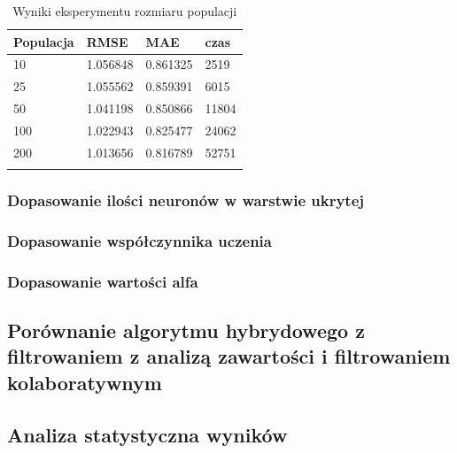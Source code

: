 \documentclass[twoside]{iisthesis}
\begin{document}
		\begin{longtable}{llll}
			\label{tab:exppopulation}
			\centering
			\textbf{Populacja} & \textbf{RMSE} & \textbf{MAE} & \textbf{czas} \\
			\hline
			10        & 1.056848 & 0.861325 & 2519                      \\
			25        & 1.055562 & 0.859391 & 6015                      \\
			50        & 1.041198 & 0.850866 & 11804                     \\
			100       & 1.022943 & 0.825477 & \multicolumn{1}{r}{24062} \\
			200       & 1.013656 & 0.816789 & 52751                     \\
			\caption{Wyniki eksperymentu rozmiaru populacji}
		\end{longtable}
	

		
		\subsubsection{Dopasowanie ilości neuronów w warstwie ukrytej}
		
		
		\subsubsection{Dopasowanie współczynnika uczenia}
		
		
		\subsubsection{Dopasowanie wartości alfa}
		

		\subsection{Porównanie algorytmu hybrydowego z filtrowaniem z analizą zawartości i filtrowaniem kolaboratywnym}


		\subsection{Analiza statystyczna wyników}		
\end{document}

